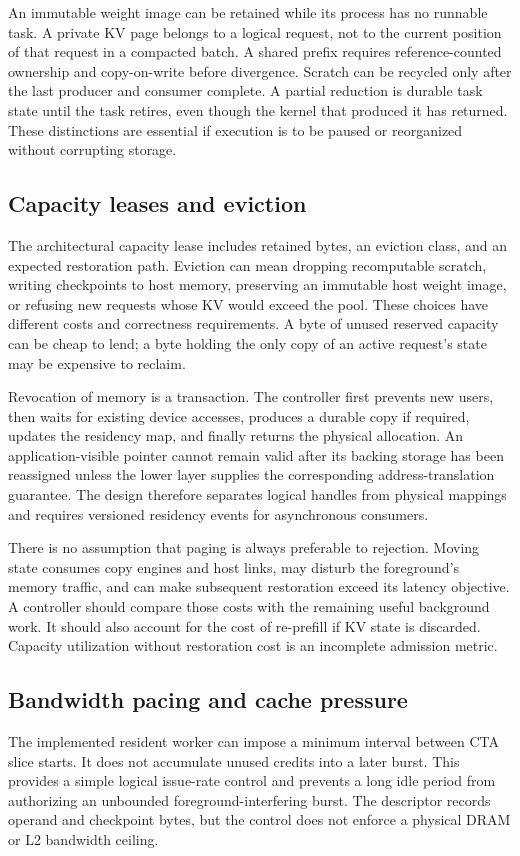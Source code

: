 An immutable weight image can be retained while its process has no runnable
task. A private KV page belongs to a logical request, not to the current
position of that request in a compacted batch. A shared prefix requires
reference-counted ownership and copy-on-write before divergence. Scratch can
be recycled only after the last producer and consumer complete. A partial
reduction is durable task state until the task retires, even though the
kernel that produced it has returned. These distinctions are essential if
execution is to be paused or reorganized without corrupting storage.

\subsection{Capacity leases and eviction}
The architectural capacity lease includes retained bytes, an eviction class,
and an expected restoration path. Eviction can mean dropping recomputable
scratch, writing checkpoints to host memory, preserving an immutable host
weight image, or refusing new requests whose KV would exceed the pool.
These choices have different costs and correctness requirements. A byte of
unused reserved capacity can be cheap to lend; a byte holding the only copy
of an active request's state may be expensive to reclaim.

Revocation of memory is a transaction. The controller first prevents new
users, then waits for existing device accesses, produces a durable copy if
required, updates the residency map, and finally returns the physical
allocation. An application-visible pointer cannot remain valid after its
backing storage has been reassigned unless the lower layer supplies the
corresponding address-translation guarantee. The design therefore separates
logical handles from physical mappings and requires versioned residency
events for asynchronous consumers.

There is no assumption that paging is always preferable to rejection. Moving
state consumes copy engines and host links, may disturb the foreground's
memory traffic, and can make subsequent restoration exceed its latency
objective. A controller should compare those costs with the remaining useful
background work. It should also account for the cost of re-prefill if KV
state is discarded. Capacity utilization without restoration cost is an
incomplete admission metric.

\subsection{Bandwidth pacing and cache pressure}
The implemented resident worker can impose a minimum interval between CTA
slice starts. It does not accumulate unused credits into a later burst. This
provides a simple logical issue-rate control and prevents a long idle period
from authorizing an unbounded foreground-interfering burst. The descriptor
records operand and checkpoint bytes, but the control does not enforce a
physical DRAM or L2 bandwidth ceiling.

